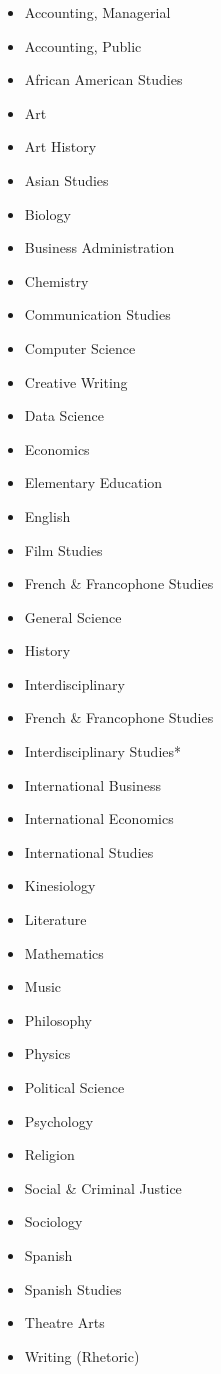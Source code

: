 \documentclass[
  letterpaper,
]{scrbook}
\providecommand{\tightlist}{%
  \setlength{\itemsep}{0pt}\setlength{\parskip}{0pt}}
\begin{document}
\begin{itemize}
\tightlist
\item
  Accounting, Managerial
\item
  Accounting, Public
\item
  African American Studies
\item
  Art
\item
  Art History
\item
  Asian Studies
\item
  Biology
\item
  Business Administration
\item
  Chemistry
\item
  Communication Studies
\item
  Computer Science
\item
  Creative Writing
\item
  Data Science
\item
  Economics
\item
  Elementary Education
\item
  English
\item
  Film Studies
\item
  French \& Francophone Studies
\item
  General Science
\item
  History
\item
  Interdisciplinary
\end{itemize}

\begin{itemize}
\tightlist
\item
  French \& Francophone Studies
\item
  Interdisciplinary Studies*
\item
  International Business
\item
  International Economics
\item
  International Studies
\item
  Kinesiology
\item
  Literature
\item
  Mathematics
\item
  Music
\item
  Philosophy
\item
  Physics
\item
  Political Science
\item
  Psychology
\item
  Religion
\item
  Social \& Criminal Justice
\item
  Sociology
\item
  Spanish
\item
  Spanish Studies
\item
  Theatre Arts
\item
  Writing (Rhetoric)
\end{itemize}
\end{document}
